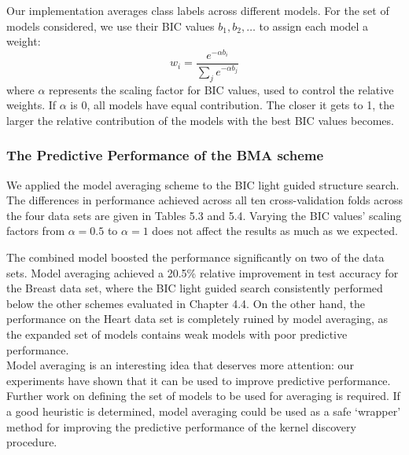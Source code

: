 \documentclass[a4paper,12pt ]{report}
\begin{document}
Our implementation averages class labels across different models. For the set of models considered, we use their BIC values $b_1, b_2, \ldots $ to assign each model a weight:
\begin{equation*} w_i = \frac{e^{- \alpha b_i}}{ \sum_{j}{ e^{- \alpha b_j} } }  \end{equation*}
where $\alpha$ represents the scaling factor for BIC values, used to control the relative weights. If $\alpha$ is 0, all models have equal contribution. The closer it gets to 1, the larger the relative contribution of the models with the best BIC values becomes.

\subsubsection*{The Predictive Performance of the BMA scheme}

We applied the model averaging scheme to the BIC light guided structure search. The differences in performance achieved across all ten cross-validation folds across the four data sets are given in Tables 5.3 and 5.4. Varying the BIC values' scaling factors from $\alpha = 0.5$ to $\alpha = 1$ does not affect the results as much as we expected.



The combined model boosted the performance significantly on two of the data sets. Model averaging achieved a 20.5\% relative improvement in test accuracy for the Breast data set, where the BIC light guided search consistently performed below the other schemes evaluated in Chapter 4.4. On the other hand, the performance on the Heart data set is completely ruined by model averaging, as the expanded set of models contains weak models with poor predictive performance.  \\


Model averaging is an interesting idea that deserves more attention: our experiments have shown that it can be used to improve predictive performance. Further work on defining the set of models to be used for averaging is required. If a good heuristic is determined, model averaging could be used as a safe `wrapper' method for improving the predictive performance of the kernel discovery procedure.
\end{document}
